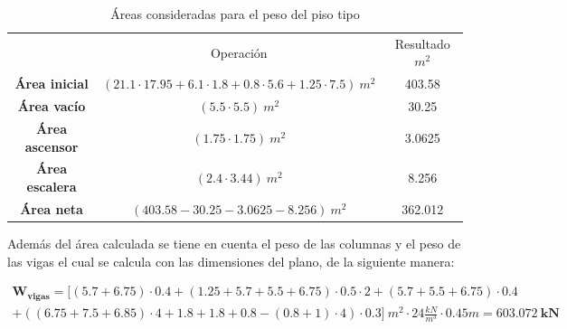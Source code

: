 \documentclass[12pt]{article}
\begin{document}
\begin{table}[H]
  \centering
    \begin{tabular}{|c|c|c|}
    \hline
    \rowcolor[rgb]{ .2,  .247,  .31} \multicolumn{3}{|c|}{\textcolor[rgb]{ 1,  1,  1}{\textbf{Áreas}}} \bigstrut\\
    \hline
    \rowcolor[rgb]{ .2,  .247,  .31} \multicolumn{1}{|c|}{\textcolor[rgb]{ 1,  1,  1}{Elemento}} & \multicolumn{1}{c|}{\textcolor[rgb]{ 1,  1,  1}{Operación }} & \multicolumn{1}{c|}{\textcolor[rgb]{ 1,  1,  1}{Resultado $m^{2}$}} \bigstrut[b]\\
    \hline
    \rowcolor[rgb]{ .2,  .247,  .31} \textcolor[rgb]{ 1,  1,  1}{\textbf{Área inicial}} & \cellcolor[rgb]{ 1,  1,  1}$(21.1\cdot17.95+6.1\cdot1.8+0.8\cdot5.6+1.25\cdot7.5)~m^{2}$ & \cellcolor[rgb]{ 1,  1,  1}403.58 \bigstrut\\
    \hline
    \rowcolor[rgb]{ .2,  .247,  .31} \textcolor[rgb]{ 1,  1,  1}{\textbf{Área vacío}} & \cellcolor[rgb]{ 1,  1,  1}$(5.5\cdot5.5)~m^{2}$ & \cellcolor[rgb]{ 1,  1,  1}30.25 \bigstrut\\
    \hline
    \rowcolor[rgb]{ .2,  .247,  .31} \textcolor[rgb]{ 1,  1,  1}{\textbf{Área ascensor}} & \cellcolor[rgb]{ 1,  1,  1}$(1.75\cdot1.75)~m^{2}$ & \cellcolor[rgb]{ 1,  1,  1}3.0625 \bigstrut\\
    \hline
    \rowcolor[rgb]{ .2,  .247,  .31} \textcolor[rgb]{ 1,  1,  1}{\textbf{Área escalera}} & \cellcolor[rgb]{ 1,  1,  1}$(2.4\cdot3.44)~m^{2}$ & \cellcolor[rgb]{ 1,  1,  1}8.256 \bigstrut\\
    \hline
    \rowcolor[rgb]{ .2,  .247,  .31} \textcolor[rgb]{ 1,  1,  1}{\textbf{Área neta}} & \cellcolor[rgb]{ 1,  1,  1}$(403.58-30.25-3.0625-8.256)~m^{2}$ & \cellcolor[rgb]{ 1,  1,  1}362.012 \bigstrut\\
    \hline
    \end{tabular}%
  \caption{Áreas consideradas para el peso del piso tipo}
  \label{tab:ÁreasPisoTipo}%
\end{table}%

Además del área calculada se tiene en cuenta el peso de las columnas  y el peso de las vigas el cual se calcula con las dimensiones del plano, de la siguiente manera:

\begin{gather*}
    \mathbf{W_{vigas}}=[(5.7+6.75)\cdot0.4+(1.25+5.7+5.5+6.75)\cdot0.5\cdot2+(5.7+5.5+6.75)\cdot0.4\\ +((6.75+7.5+6.85)\cdot4+1.8+1.8+0.8-(0.8+1)\cdot4)\cdot0.3]~m^{2}\cdot24\tfrac{kN}{m^{3}}\cdot0.45m=\mathbf{603.072~kN}
\end{gather*}
\end{document}
